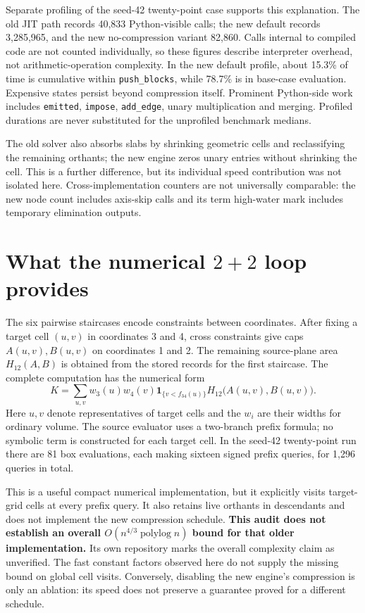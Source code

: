 \documentclass[12pt,a4paper]{article}
\begin{document}
Separate profiling of the seed-42 twenty-point case supports this explanation.
The old JIT path records 40,833 Python-visible calls; the new default records
3,285,965, and the new no-compression variant 82,860. Calls internal to compiled
code are not counted individually, so these figures describe interpreter
overhead, not arithmetic-operation complexity. In the new default profile,
about 15.3\% of time is cumulative within \texttt{push\_blocks}, while 78.7\%
is in base-case evaluation. Expensive states persist beyond compression itself.
Prominent Python-side work includes \texttt{emitted}, \texttt{impose},
\texttt{add\_edge}, unary multiplication and merging. Profiled durations
are never substituted for the unprofiled benchmark medians.

The old solver also absorbs slabs by shrinking geometric cells and reclassifying
the remaining orthants; the new engine zeros unary entries without shrinking
the cell. This is a further difference, but its individual speed contribution
was not isolated here. Cross-implementation counters are not universally
comparable: the new node count includes axis-skip calls and its term high-water
mark includes temporary elimination outputs.

\section{What the numerical $2+2$ loop provides}
The six pairwise staircases encode constraints between coordinates. After
fixing a target cell $(u,v)$ in coordinates 3 and 4, cross constraints give
caps $A(u,v),B(u,v)$ on coordinates 1 and 2. The remaining source-plane area
$H_{12}(A,B)$ is obtained from the stored records for the first staircase.
The complete computation has the numerical form
\[
 K=\sum_{u,v} w_3(u)w_4(v)
       \mathbf{1}_{\{v<f_{34}(u)\}}
       H_{12}\bigl(A(u,v),B(u,v)\bigr).
\]
Here $u,v$ denote representatives of target cells and the $w_i$ are their
widths for ordinary volume. The source evaluator uses a two-branch prefix
formula; no symbolic term is constructed for each target cell. In the
seed-42 twenty-point run there are 81 box evaluations, each making sixteen
signed prefix queries, for 1,296 queries in total.

This is a useful compact numerical implementation, but it explicitly visits
target-grid cells at every prefix query. It also retains live orthants in
descendants and does not implement the new compression schedule.
\textbf{This audit does not establish an overall
$O(n^{4/3}\operatorname{polylog}n)$ bound for that older implementation.}
Its own repository marks the overall complexity claim as unverified.
The fast constant factors observed here do not supply the missing bound on
global cell visits. Conversely, disabling the new engine's compression is
only an ablation: its speed does not preserve a guarantee proved for a different
schedule.
\end{document}
